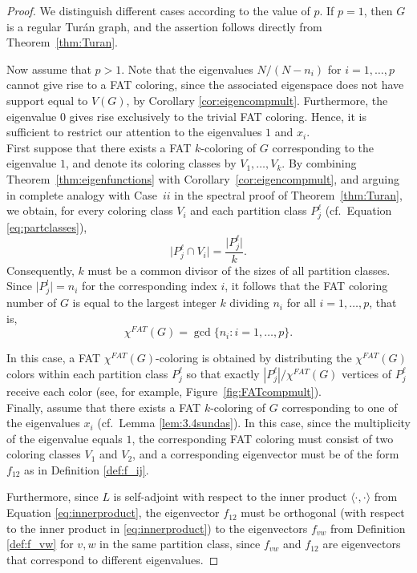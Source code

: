 \documentclass{article}
\theoremstyle{plain}
\theoremstyle{definition}
\theoremstyle{remark}
\begin{document}
\begin{proof}
    We distinguish different cases according to the value of $p$. If $p=1$, then $G$ is a regular Turán graph, and the assertion follows directly from Theorem~\ref{thm:Turan}.
    
    Now assume that $p>1$. Note that the eigenvalues $N/(N-n_i)$ for $i=1,\ldots,p$ cannot give rise to a FAT coloring, since the associated eigenspace does not have support equal to $V(G)$, by Corollary \ref{cor:eigencompmult}. Furthermore, the eigenvalue $0$ gives rise exclusively to the trivial FAT coloring. Hence, it is sufficient to restrict our attention to the eigenvalues $1$ and $x_i$.\\
    
    First suppose that there exists a FAT $k$-coloring of $G$ corresponding to the eigenvalue $1$, and denote its coloring classes by $V_1,\ldots,V_k$.
    By combining Theorem~\ref{thm:eigenfunctions} with Corollary~\ref{cor:eigencompmult}, and arguing in complete analogy with Case~$ii$ in the spectral proof of Theorem~\ref{thm:Turan}, we obtain, for every coloring class $V_i$ and each partition class $P_j^\ell$ (cf.\ Equation \eqref{eq:partclasses}),
    \[
        \bigl|P_j^\ell \cap V_i\bigr| = \frac{\bigl|P_j^\ell\bigr|}{k}.
    \]
    Consequently, $k$ must be a common divisor of the sizes of all partition classes. Since $\lvert P_j^l\rvert = n_i$ for the corresponding index $i$, it follows that the FAT coloring number of $G$ is equal to the largest integer $k$ dividing $n_i$ for all $i=1,\ldots,p$, that is,
    \[
        \chi^{FAT}(G) = \gcd\{n_i : i=1,\ldots,p\}.
    \]
  
    In this case, a FAT $\chi^{FAT}(G)$-coloring is obtained by distributing the $\chi^{FAT}(G)$ colors within each partition class $P_j^{\ell}$ so that exactly $|P_j^{\ell}|/\chi^{FAT}(G)$ vertices of $P_j^{\ell}$ receive each color (see, for example, Figure~\ref{fig:FATcompmult}).\\

    Finally, assume that there exists a FAT $k$-coloring of $G$ corresponding to one of the eigenvalues $x_i$ (cf.\ Lemma \ref{lem:3.4sundas}). In this case, since the multiplicity of the eigenvalue equals $1$, the corresponding FAT coloring must consist of two coloring classes $V_1$ and $V_2$, and a corresponding eigenvector must be of the form $f_{12}$ as in Definition \ref{def:f_ij}.
    
    Furthermore, since $L$ is self-adjoint with respect to the inner product $\langle \cdot,\cdot\rangle$ from Equation \eqref{eq:innerproduct},
    the eigenvector $f_{12}$ must be orthogonal (with respect to the inner product in \eqref{eq:innerproduct}) to the eigenvectors $f_{vw}$ from Definition \ref{def:f_vw} for $v,w$ in the same partition class, since $f_{vw}$ and $f_{12}$ are eigenvectors that correspond to different eigenvalues.


\end{proof}
\end{document}

